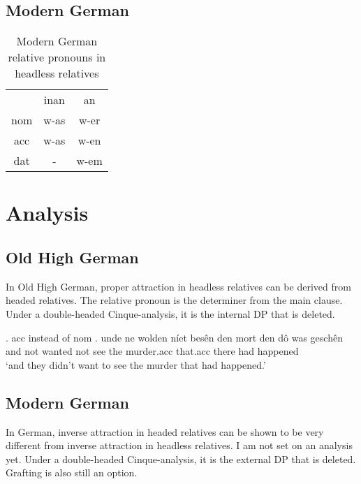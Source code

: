 \subsection{Modern German}

\begin{table}[h]
	\center
	\caption {Modern German relative pronouns in headless relatives}
		\begin{tabular}{ccc}
		\toprule
							& \ac{inan}	& \ac{an}	\\
								\cmidrule{2-3}
    \ac{nom} & w-as    		& w-er   		\\
    \ac{acc} & w-as    		& w-en   		\\
    \ac{dat} & -  					& w-em    	\\
		\bottomrule
		\end{tabular}
\end{table}

\section{Analysis}

\subsection{Old High German}
In Old High German, proper attraction in headless relatives can be derived from headed relatives. The relative pronoun is the determiner from the main clause. Under a double-headed Cinque-analysis, it is the internal DP that is deleted.




\ex. \ac{acc} instead of \ac{nom}
\ag. unde ne wolden níet besên den mort den dô was geschên\\
 and not wanted not see the murder.\ac{acc} that.\ac{acc} there had happened\\
 `and they didn't want to see the murder that had happened.' 



    \subsection{Modern German}
In German, inverse attraction in headed relatives can be shown to be very different from inverse attraction in headless relatives. I am not set on an analysis yet. Under a double-headed Cinque-analysis, it is the external DP that is deleted. Grafting is also still an option.


